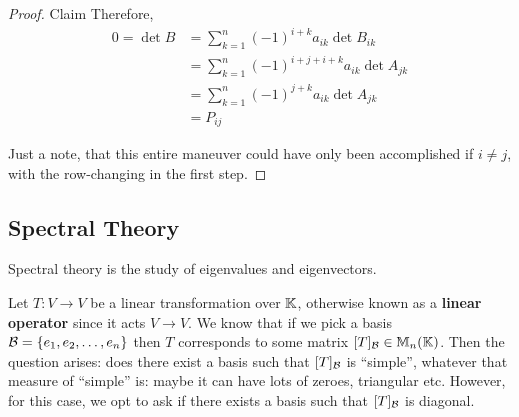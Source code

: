 \begin{proof} {Claim}
    Therefore, \begin{align*}
        0 = \det B & = \sum_{k=1}^{n} (-1)^{i+k}a_{ik}\det B_{ik}    \\
                   & = \sum_{k=1}^{n}(-1)^{i+j+i+k}a_{ik}\det A_{jk} \\
                   & = \sum_{k=1}^{n}(-1)^{j+k}a_{ik}\det A_{jk}     \\
                   & = P_{ij}
    \end{align*}

    Just a note, that this entire maneuver could have only been accomplished if \(i \neq j\), with the row-changing in the first step.
\end{proof}

\subsection{Spectral Theory}
\begin{motivation}
    Spectral theory is the study of eigenvalues and eigenvectors.

    Let \(T: V \to V\) be a linear transformation over \(\mathbb{K}\), otherwise known as a \textbf{linear operator} since it acts \(V \to V\). We know that if we pick a basis \(\mathcal{B} = \{e_1, e_2, \dots, e_n\}\) then \(T \) corresponds to some matrix \([T]_{\mathcal{B}} \in \mathbb{M}_n(\mathbb{K}) \). Then the question arises: does there exist a basis such that \([T]_{\mathcal{B}}\) is ``simple'', whatever that measure of ``simple'' is: maybe it can have lots of zeroes, triangular etc. However, for this case, we opt to ask if there exists a basis such that \([T]_{\mathcal{B}}\) is diagonal.
\end{motivation}

